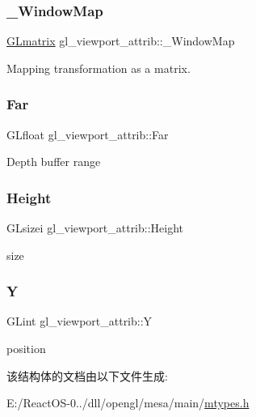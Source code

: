 \subsubsection{\texorpdfstring{\+\_\+\+Window\+Map}{\_WindowMap}}
{\footnotesize\ttfamily \hyperlink{struct_g_lmatrix}{G\+Lmatrix} gl\+\_\+viewport\+\_\+attrib\+::\+\_\+\+Window\+Map}

Mapping transformation as a matrix. \mbox{\label{structgl__viewport__attrib_a53f7a7cfe759cdcae99397a9c51fdc36}} 
\subsubsection{\texorpdfstring{Far}{Far}}
{\footnotesize\ttfamily G\+Lfloat gl\+\_\+viewport\+\_\+attrib\+::\+Far}

Depth buffer range \mbox{\label{structgl__viewport__attrib_a4579e0442567cf9f78d7538f50830afb}} 
\subsubsection{\texorpdfstring{Height}{Height}}
{\footnotesize\ttfamily G\+Lsizei gl\+\_\+viewport\+\_\+attrib\+::\+Height}

size \mbox{\label{structgl__viewport__attrib_af70111dc22dd4c0d0ce66e9bdeeca1c3}} 
\subsubsection{\texorpdfstring{Y}{Y}}
{\footnotesize\ttfamily G\+Lint gl\+\_\+viewport\+\_\+attrib\+::Y}

position 

该结构体的文档由以下文件生成\+:\begin{DoxyCompactItemize}
\item 
E\+:/\+React\+O\+S-\/0../dll/opengl/mesa/main/\hyperlink{mtypes_8h}{mtypes.\+h}\end{DoxyCompactItemize}
